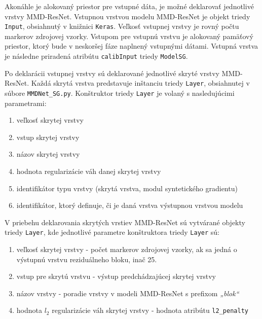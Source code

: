 Akonáhle je alokovaný priestor pre vstupné dáta, je možné deklarovať jednotlivé vrstvy MMD-ResNet. Vstupnou vrstvou modelu MMD-ResNet je objekt triedy \texttt{Input}, obsiahnutý v knižnici \texttt{Keras}. Veľkosť vstupnej vrstvy je rovný počtu markerov zdrojovej vzorky. Vstupom pre vstupnú vrstvu je alokovaný pamäťový priestor, ktorý bude v neskoršej fáze naplnený vstupnými dátami. Vstupná vrstva je následne priradená atribútu \texttt{calibInput} triedy \texttt{ModelSG}.

\begin{sloppypar}
Po deklarácii vstupnej vrstvy sú deklarované jednotlivé skryté vrstvy MMD-ResNet. Každá skrytá vrstva predstavuje inštanciu triedy \texttt{Layer}, obsiahnutej v súbore \texttt{MMDNet_SG.py}. Konštruktor triedy \texttt{Layer} je volaný s nasledujúcimi parametrami:
\end{sloppypar}
\begin{enumerate}
    \item veľkosť skrytej vrstvy
    \item vstup skrytej vrstvy
    \item názov skrytej vrstvy
    \item hodnota regularizácie váh danej skrytej vrstvy
    \item identifikátor typu vrstvy (skrytá vrstva, modul syntetického gradientu)
    \item identifikátor, ktorý definuje, či je daná vrstva výstupnou vrstvou modelu
\end{enumerate}
V priebehu deklarovania skrytých vrstiev MMD-ResNet sú vytvárané objekty triedy \texttt{Layer}, kde jednotlivé parametre konštruktora triedy \texttt{Layer} sú:
\begin{enumerate}
    \item veľkosť skrytej vrstvy - počet markerov zdrojovej vzorky, ak sa jedná o výstupnú vrstvu reziduálneho bloku, inač 25.
    \item vstup pre skrytú vrstvu - výstup predchádzajúcej skrytej vrstvy
    \item názov vrstvy - poradie vrstvy v modeli MMD-ResNet s prefixom \textit{„blok“}
    \item hodnota $l_2$ regularizácie váh skrytej vrstvy - hodnota atribútu \texttt{l2_penalty}
\end{enumerate}

